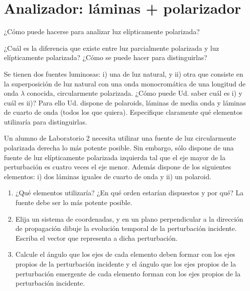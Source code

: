 \section*{Analizador: láminas + polarizador}

\item ¿Cómo puede hacerse para analizar luz elípticamente polarizada?


\item ¿Cuál es la diferencia que existe entre luz parcialmente polarizada y luz elípticamente polarizada?
¿Cómo se puede hacer para distinguirlas?



\item Se tienen dos fuentes luminosas: i) una de luz natural, y ii) otra que consiste en la superposición de luz natural con una onda monocromática de una longitud de onda $\lambda$ conocida, circularmente polarizada.
¿Cómo puede Ud. saber cuál es i) y cuál es ii)?
Para ello Ud. dispone de polaroids, láminas de media onda y láminas de cuarto de onda (todos los que quiera).
Especifique claramente qué elementos utilizaría para distinguirlas.



\item Un alumno de Laboratorio 2 necesita utilizar una fuente de luz circularmente polarizada derecha lo más potente posible.
Sin embargo, sólo dispone de una fuente de luz elípticamente polarizada izquierda tal que el eje mayor de la perturbación es cuatro veces el eje menor.
Además dispone de los siguientes elementos: i) dos láminas iguales de cuarto de onda y ii) un polaroid.
\begin{enumerate}
	\item ¿Qué elementos utilizaría? ¿En qué orden estarían dispuestos y por qué?
	La fuente debe ser lo más potente posible.
	\item Elija un sistema de coordenadas, y en un plano perpendicular a la dirección de propagación dibuje la evolución temporal de la perturbación incidente.
	Escriba el vector que representa a dicha perturbación.
	\item Calcule el ángulo que los ejes de cada elemento deben formar con los ejes propios de la perturbación incidente y el ángulo que los ejes propios de la perturbación emergente de cada elemento forman con los ejes propios de la perturbación incidente.
\end{enumerate}




